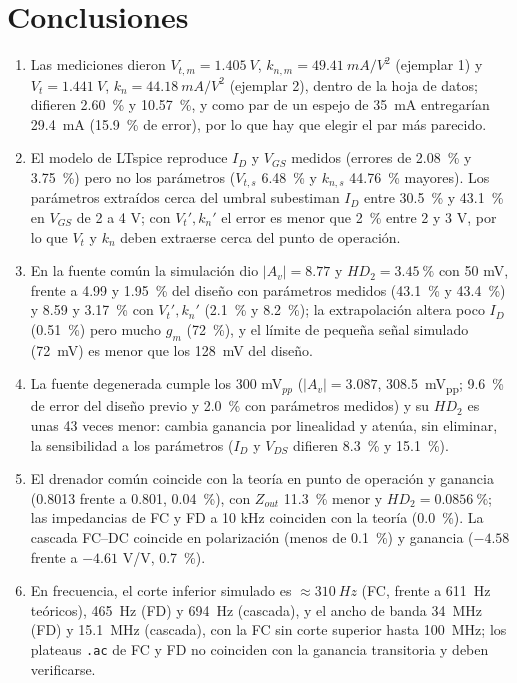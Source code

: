 \documentclass[conference]{IEEEtran}
\newcommand{\gm}{g_m}
\newcommand{\kn}{k_n}
\newcommand{\Vtp}{V_t'}
\newcommand{\knp}{k_n'}
\newcommand{\Vts}{V_{t,s}}
\newcommand{\kns}{k_{n,s}}
\newcommand{\Vtm}{V_{t,m}}
\newcommand{\knm}{k_{n,m}}
\begin{document}
\section{Conclusiones}
\begin{enumerate}
\item Las mediciones dieron $\Vtm=\SI{1.405}{V}$, $\knm=\SI{49.41}{mA/V^2}$ (ejemplar 1) y $V_t=\SI{1.441}{V}$, $\kn=\SI{44.18}{mA/V^2}$ (ejemplar 2), dentro de la hoja de datos; difieren \SI{2.60}{\percent} y \SI{10.57}{\percent}, y como par de un espejo de \SI{35}{mA} entregarían \SI{29.4}{mA} (\SI{15.9}{\percent} de error), por lo que hay que elegir el par más parecido.
\item El modelo de LTspice reproduce $I_D$ y $V_{GS}$ medidos (errores de \SI{2.08}{\percent} y \SI{3.75}{\percent}) pero no los parámetros ($\Vts$ \SI{6.48}{\percent} y $\kns$ \SI{44.76}{\percent} mayores). Los parámetros extraídos cerca del umbral subestiman $I_D$ entre \SI{30.5}{\percent} y \SI{43.1}{\percent} en $V_{GS}$ de 2 a 4 V; con $\Vtp,\knp$ el error es menor que \SI{2}{\percent} entre 2 y 3 V, por lo que $V_t$ y $\kn$ deben extraerse cerca del punto de operación.
\item En la fuente común la simulación dio $|A_v|=8.77$ y $HD_2=\SI{3.45}{\percent}$ con 50 mV, frente a 4.99 y \SI{1.95}{\percent} del diseño con parámetros medidos (\SI{43.1}{\percent} y \SI{43.4}{\percent}) y 8.59 y \SI{3.17}{\percent} con $\Vtp,\knp$ (\SI{2.1}{\percent} y \SI{8.2}{\percent}); la extrapolación altera poco $I_D$ (\SI{0.51}{\percent}) pero mucho $\gm$ (\SI{72}{\percent}), y el límite de pequeña señal simulado (\SI{72}{mV}) es menor que los \SI{128}{mV} del diseño.
\item La fuente degenerada cumple los 300 mV$_{pp}$ ($|A_v|=3.087$, \SI{308.5}{mV_{pp}}; \SI{9.6}{\percent} de error del diseño previo y \SI{2.0}{\percent} con parámetros medidos) y su $HD_2$ es unas 43 veces menor: cambia ganancia por linealidad y atenúa, sin eliminar, la sensibilidad a los parámetros ($I_D$ y $V_{DS}$ difieren \SI{8.3}{\percent} y \SI{15.1}{\percent}).
\item El drenador común coincide con la teoría en punto de operación y ganancia (0.8013 frente a 0.801, \SI{0.04}{\percent}), con $Z_{out}$ \SI{11.3}{\percent} menor y $HD_2=\SI{0.0856}{\percent}$; las impedancias de FC y FD a 10 kHz coinciden con la teoría (\SI{0.0}{\percent}). La cascada FC--DC coincide en polarización (menos de \SI{0.1}{\percent}) y ganancia ($-4.58$ frente a $-4.61$ V/V, \SI{0.7}{\percent}).
\item En frecuencia, el corte inferior simulado es $\approx\SI{310}{Hz}$ (FC, frente a \SI{611}{Hz} teóricos), \SI{465}{Hz} (FD) y \SI{694}{Hz} (cascada), y el ancho de banda \SI{34}{MHz} (FD) y \SI{15.1}{MHz} (cascada), con la FC sin corte superior hasta \SI{100}{MHz}; los plateaus \texttt{.ac} de FC y FD no coinciden con la ganancia transitoria y deben verificarse.
\end{enumerate}
\end{document}
